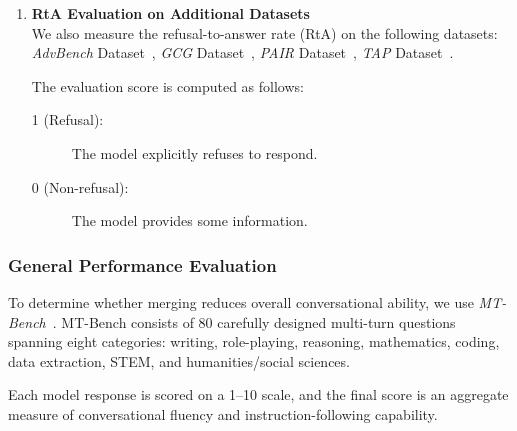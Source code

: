 \documentclass[conference,compsoc]{IEEEtran}
\begin{document}
\begin{enumerate}
    \item \textbf{RtA Evaluation on Additional Datasets}
    \\We also measure the refusal-to-answer rate (RtA) on the following datasets: \textit{AdvBench} Dataset~\cite{mazeika2024harmbench}, \textit{GCG} Dataset~\cite{chao2023jailbreaking}, \textit{PAIR} Dataset~\cite{chao2023jailbreaking}, \textit{TAP} Dataset~\cite{mehrotra2023tree}.
    
    The evaluation score is computed as follows:
    \begin{description}
        \item[1 (Refusal):] The model explicitly refuses to respond.
        \item[0 (Non-refusal):] The model provides some information.
    \end{description}
\end{enumerate}

\subsubsection{General Performance Evaluation}
To determine whether merging reduces overall conversational ability, we use \emph{MT-Bench}~\cite{zheng2023judging}. MT-Bench consists of 80 carefully designed multi-turn questions spanning eight categories: writing, role-playing, reasoning, mathematics, coding, data extraction, STEM, and humanities/social sciences.

Each model response is scored on a 1–10 scale, and the final score is an aggregate measure of conversational fluency and instruction-following capability.

\end{document}
